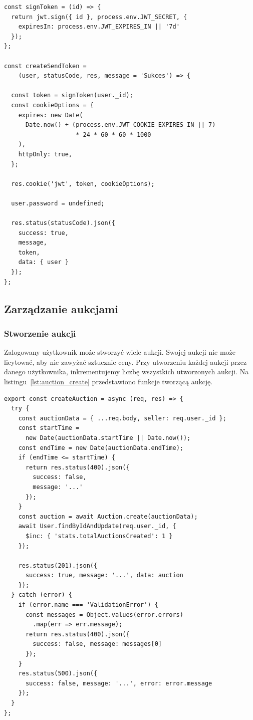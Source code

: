 \begin{lstlisting}[style=javascript, caption = {Implementacja autentykacji użytkownika}, label = {lst:user_auth}]
const signToken = (id) => {
  return jwt.sign({ id }, process.env.JWT_SECRET, {
    expiresIn: process.env.JWT_EXPIRES_IN || '7d'
  });
};

const createSendToken = 
	(user, statusCode, res, message = 'Sukces') => {
  
  const token = signToken(user._id);
  const cookieOptions = {
    expires: new Date(
      Date.now() + (process.env.JWT_COOKIE_EXPIRES_IN || 7) 
      				* 24 * 60 * 60 * 1000
    ),
    httpOnly: true,
  };

  res.cookie('jwt', token, cookieOptions);

  user.password = undefined;

  res.status(statusCode).json({
    success: true,
    message,
    token,
    data: { user }
  });
};
\end{lstlisting}

\subsection{Zarządzanie aukcjami}

\subsubsection{Stworzenie aukcji}

Zalogowany użytkownik może stworzyć wiele aukcji. Swojej aukcji nie może licytować, aby nie zawyżać sztucznie ceny. Przy utworzeniu każdej aukcji przez danego użytkownika, inkrementujemy liczbę wszystkich utworzonych aukcji. Na listingu~\ref{lst:auction_create} przedstawiono funkcje tworzącą aukcję.

\begin{lstlisting}[style=javascript, caption = {Obsługa utworzenia aukcji}, label = {lst:auction_create}]
export const createAuction = async (req, res) => {
  try {
    const auctionData = { ...req.body, seller: req.user._id };
    const startTime = 
      new Date(auctionData.startTime || Date.now());
    const endTime = new Date(auctionData.endTime);
    if (endTime <= startTime) {
      return res.status(400).json({
        success: false, 
        message: '...'
      });
    }
    const auction = await Auction.create(auctionData);
    await User.findByIdAndUpdate(req.user._id, {
      $inc: { 'stats.totalAuctionsCreated': 1 }
    });

    res.status(201).json({
      success: true, message: '...', data: auction
    });
  } catch (error) {
    if (error.name === 'ValidationError') {
      const messages = Object.values(error.errors)
      	.map(err => err.message);
      return res.status(400).json({
        success: false, message: messages[0]
      });
    }
    res.status(500).json({
      success: false, message: '...', error: error.message
    });
  }
};
\end{lstlisting}

